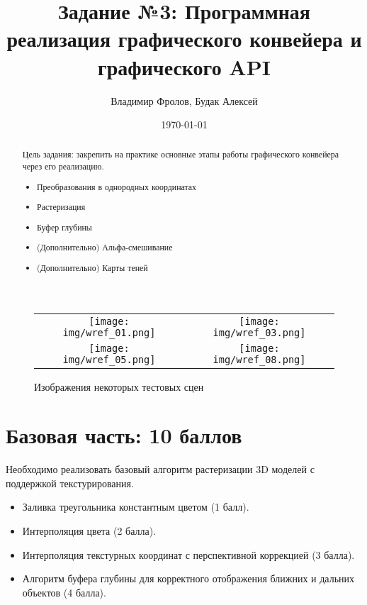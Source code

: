 \documentclass[12pt,subf,href,colorlinks=true]{article}
\title{Задание №3: Программная реализация графического конвейера и графического API}
\author{Владимир Фролов, Будак Алексей}
\date{\today}
\begin{document}
\maketitle

\begin{abstract}

\noindent Цель задания: закрепить на практике основные этапы работы графического конвейера через его реализацию.

\begin{itemize}

\item Преобразования в однородных координатах
\item Растеризация
\item Буфер глубины
\item (Дополнительно) Альфа-смешивание
\item (Дополнительно) Карты теней

\end{itemize}

\end{abstract}


\begin{figure}
	\begin{center}
		\begin{tabular}{c c}
			\texttt{[image: img/wref\_01.png]} &
			\texttt{[image: img/wref\_03.png]} \\
			\texttt{[image: img/wref\_05.png]} &
			\texttt{[image: img/wref\_08.png]} \\
		\end{tabular}
		\caption{Изображения некоторых тестовых сцен}
		\label{fig:images}
	\end{center}
\end{figure}

\section{Базовая часть: 10 баллов}

Необходимо реализовать базовый алгоритм растеризации 3D моделей с поддержкой текстурирования.

\begin{itemize}
  \item Заливка треугольника константным цветом (1 балл).
  \item Интерполяция цвета (2 балла).
  \item Интерполяция текстурных координат с перспективной коррекцией (3 балла).
  \item Алгоритм буфера глубины для корректного отображения ближних и дальних объектов (4 балла).
\end{itemize}
\end{document}

